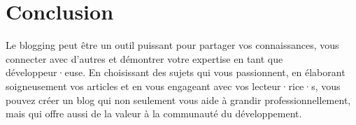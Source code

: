 \section{Conclusion}

Le blogging peut être un outil puissant pour partager vos connaissances, vous connecter avec d'autres et démontrer votre expertise en tant que développeur·euse. En choisissant des sujets qui vous passionnent, en élaborant soigneusement vos articles et en vous engageant avec vos lecteur·rice·s, vous pouvez créer un blog qui non seulement vous aide à grandir professionnellement, mais qui offre aussi de la valeur à la communauté du développement.


